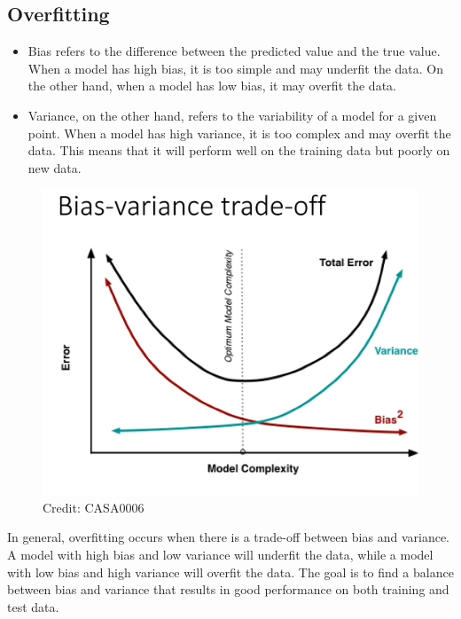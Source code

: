\documentclass[
  letterpaper,
  DIV=11,
  numbers=noendperiod]{scrreprt}
\providecommand{\tightlist}{%
  \setlength{\itemsep}{0pt}\setlength{\parskip}{0pt}}\usepackage{longtable,booktabs,array}
\begin{document}
\hypertarget{overfitting}{%
\subsection{Overfitting}\label{overfitting}}

\begin{itemize}
\tightlist
\item
  Bias refers to the difference between the predicted value and the true
  value. When a model has high bias, it is too simple and may underfit
  the data. On the other hand, when a model has low bias, it may overfit
  the data.
\item
  Variance, on the other hand, refers to the variability of a model for
  a given point. When a model has high variance, it is too complex and
  may overfit the data. This means that it will perform well on the
  training data but poorly on new data.
\end{itemize}

\begin{figure}

{\centering \includegraphics{./images/Bias-variance-01.png}

}

\caption{\label{fig-BiasVar01}Credit: CASA0006}

\end{figure}

In general, overfitting occurs when there is a trade-off between bias
and variance. A model with high bias and low variance will underfit the
data, while a model with low bias and high variance will overfit the
data. The goal is to find a balance between bias and variance that
results in good performance on both training and test data.
\end{document}
